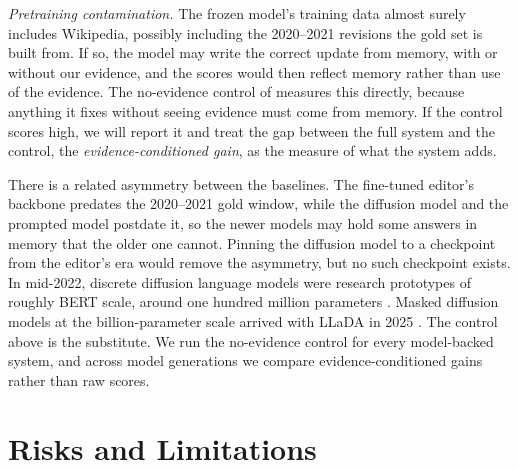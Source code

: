 \documentclass[]{paper}
\begin{document}
\emph{Pretraining contamination.} The frozen model's training data almost surely includes Wikipedia, possibly including the 2020--2021 revisions the gold set is built from. If so, the model may write the correct update from memory, with or without our evidence, and the scores would then reflect memory rather than use of the evidence. The no-evidence control of  measures this directly, because anything it fixes without seeing evidence must come from memory. If the control scores high, we will report it and treat the gap between the full system and the control, the \emph{evidence-conditioned gain}, as the measure of what the system adds.

There is a related asymmetry between the baselines. The fine-tuned editor's backbone predates the 2020--2021 gold window, while the diffusion model and the prompted model postdate it, so the newer models may hold some answers in memory that the older one cannot. Pinning the diffusion model to a checkpoint from the editor's era would remove the asymmetry, but no such checkpoint exists. In mid-2022, discrete diffusion language models were research prototypes of roughly BERT scale, around one hundred million parameters \citep{austin-etal-2021-structured, he-etal-2022-diffusionbert}. Masked diffusion models at the billion-parameter scale arrived with LLaDA in 2025 \citep{nie-etal-2025-llada}. The control above is the substitute. We run the no-evidence control for every model-backed system, and across model generations we compare evidence-conditioned gains rather than raw scores.

\section{Risks and Limitations}
\label{sec:risks}
\end{document}
